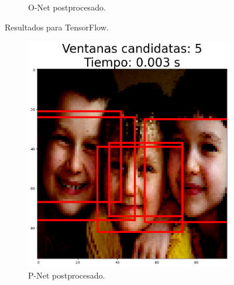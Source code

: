 \begin{figure}[!htpb]
\begin{subfigure}[b]{0.28\textwidth}
         \caption{O-Net postprocesado.}
         \label{fig:2de3}
     \end{subfigure}
     \hfill
        \caption{Resultados para TensorFlow.}
        \label{fig:test_tf_pnet}
\end{figure}

\clearpage


\begin{figure}[!htpb]
     \centering
     \begin{subfigure}[b]{0.28\textwidth}
         \centering
         \includegraphics[width=\textwidth]{./Figures/test_tf_pnet_b.png}
         \caption{P-Net postprocesado.}
         \label{fig:1de3}
     \end{subfigure}
     \hfill
     \begin{subfigure}[b]{0.28\textwidth}
         \centering

\end{subfigure}
\end{figure}
